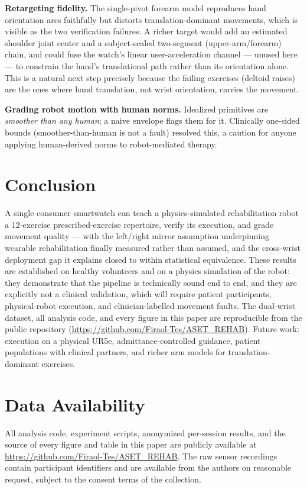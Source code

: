 \documentclass[conference]{IEEEtran}
\begin{document}
\textbf{Retargeting fidelity.} The single-pivot forearm model
reproduces hand orientation arcs faithfully but distorts
translation-dominant movements, which is visible as the two
verification failures. A richer target would add an estimated shoulder
joint center and a subject-scaled two-segment (upper-arm/forearm)
chain, and could fuse the watch's linear user-acceleration channel ---
unused here --- to constrain the hand's translational path rather than
its orientation alone. This is a natural next step precisely because
the failing exercises (deltoid raises) are the ones where hand
translation, not wrist orientation, carries the movement.

\textbf{Grading robot motion with human norms.} Idealized primitives
are \emph{smoother than any human}; a naive envelope flags them for
it. Clinically one-sided bounds (smoother-than-human is not a fault)
resolved this, a caution for anyone applying human-derived norms to
robot-mediated therapy.

\section{Conclusion}
A single consumer smartwatch can teach a physics-simulated rehabilitation robot a
12-exercise prescribed-exercise repertoire, verify its execution, and grade
movement quality --- with the left/right mirror assumption underpinning
wearable rehabilitation finally measured rather than assumed, and the
cross-wrist deployment gap it explains closed to within statistical
equivalence. These results are established on healthy volunteers and
on a physics simulation of the robot: they demonstrate that the
pipeline is technically sound end to end, and they are explicitly not
a clinical validation, which will require patient participants,
physical-robot execution, and clinician-labelled movement faults. The
dual-wrist dataset, all analysis code, and every figure in this paper
are reproducible from the public repository
(\url{https://github.com/Firaol-Tes/ASET_REHAB}).
Future work: execution on a physical UR5e, admittance-controlled
guidance, patient populations with clinical partners, and richer arm
models for translation-dominant exercises.

\section*{Data Availability}
All analysis code, experiment scripts, anonymized per-session results,
and the source of every figure and table in this paper are publicly
available at \url{https://github.com/Firaol-Tes/ASET_REHAB}.
The raw sensor recordings contain participant identifiers and are
available from the authors on reasonable request, subject to the
consent terms of the collection.
\end{document}
